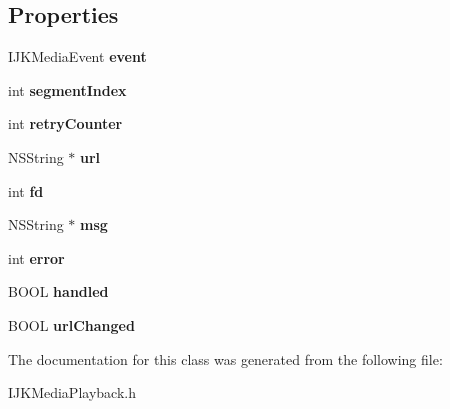 \subsection*{Properties}
\begin{DoxyCompactItemize}
\item 
\mbox{\label{interface_i_j_k_media_url_open_data_a719982e2ba62c975f6fd5068ea294bdb}} 
I\+J\+K\+Media\+Event {\bfseries event}
\item 
\mbox{\label{interface_i_j_k_media_url_open_data_a5d7a6513b91b11dfb4ce46dc46c65e5f}} 
int {\bfseries segment\+Index}
\item 
\mbox{\label{interface_i_j_k_media_url_open_data_a12b71044ef4241f200e3dbfdd4ecb860}} 
int {\bfseries retry\+Counter}
\item 
\mbox{\label{interface_i_j_k_media_url_open_data_a71ca433dfbf6f2f92e84e8a593ec087d}} 
N\+S\+String $\ast$ {\bfseries url}
\item 
\mbox{\label{interface_i_j_k_media_url_open_data_a6c41e8bf2234a3a7d34af7411b36b67e}} 
int {\bfseries fd}
\item 
\mbox{\label{interface_i_j_k_media_url_open_data_a6757fbf435294441d556e10f12827804}} 
N\+S\+String $\ast$ {\bfseries msg}
\item 
\mbox{\label{interface_i_j_k_media_url_open_data_ae5add1589d9bf626cf7351118f3463b7}} 
int {\bfseries error}
\item 
\mbox{\label{interface_i_j_k_media_url_open_data_a34cfabdf5dece81bd245110e1d07e40e}} 
B\+O\+OL {\bfseries handled}
\item 
\mbox{\label{interface_i_j_k_media_url_open_data_a9b44cd5d701744e02bd4eeabf2be6379}} 
B\+O\+OL {\bfseries url\+Changed}
\end{DoxyCompactItemize}


The documentation for this class was generated from the following file\+:\begin{DoxyCompactItemize}
\item 
I\+J\+K\+Media\+Playback.\+h\end{DoxyCompactItemize}

